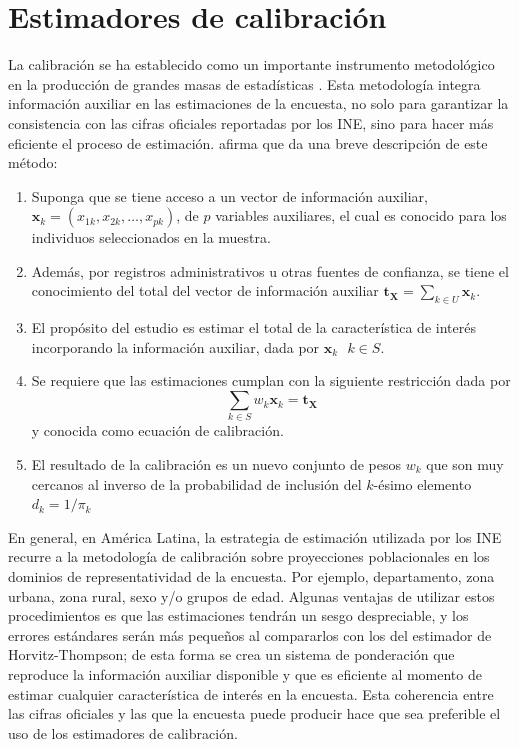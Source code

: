 \documentclass[
  10pt,
  spanish,
]{book}
\providecommand{\tightlist}{%
  \setlength{\itemsep}{0pt}\setlength{\parskip}{0pt}}
\begin{document}
\hypertarget{estimadores-de-calibraciuxf3n}{%
\section{Estimadores de calibración}\label{estimadores-de-calibraciuxf3n}}

La calibración se ha establecido como un importante instrumento metodológico en la producción de grandes masas de estadísticas \citep{Sar08}. Esta metodología integra información auxiliar en las estimaciones de la encuesta, no solo para garantizar la consistencia con las cifras oficiales reportadas por los INE, sino para hacer más eficiente el proceso de estimación. \citet{Gutierrez_2016} afirma que da una breve descripción de este método:

\begin{enumerate}
\def\labelenumi{\arabic{enumi}.}
\tightlist
\item
  Suponga que se tiene acceso a un vector de información auxiliar, \(\mathbf{x}_k=(x_{1k}, x_{2k},\ldots,x_{pk})\), de \(p\) variables auxiliares, el cual es conocido para los individuos seleccionados en la muestra.
\item
  Además, por registros administrativos u otras fuentes de confianza, se tiene el conocimiento del total del vector de información auxiliar \(\mathbf{t_X}=\sum_{k\in U}\mathbf{x}_k\).
\item
  El propósito del estudio es estimar el total de la característica de interés incorporando la información auxiliar, dada por \(\mathbf{x}_k \ \ \ k\in S\).
\item
  Se requiere que las estimaciones cumplan con la siguiente restricción dada por
  \[
    \sum_{k\in S}w_k\mathbf{x}_k = \mathbf{t_X}
  \]
  y conocida como ecuación de calibración.
\item
  El resultado de la calibración es un nuevo conjunto de pesos \(w_k\) que son muy cercanos al inverso de la probabilidad de inclusión del \(k\)-ésimo elemento \(d_k=1/\pi_k\)
\end{enumerate}

En general, en América Latina, la estrategia de estimación utilizada por los INE recurre a la metodología de calibración sobre proyecciones poblacionales en los dominios de representatividad de la encuesta. Por ejemplo, departamento, zona urbana, zona rural, sexo y/o grupos de edad. Algunas ventajas de utilizar estos procedimientos es que las estimaciones tendrán un sesgo despreciable, y los errores estándares serán más pequeños al compararlos con los del estimador de Horvitz-Thompson; de esta forma se crea un sistema de ponderación que reproduce la información auxiliar disponible y que es eficiente al momento de estimar cualquier característica de interés en la encuesta. Esta coherencia entre las cifras oficiales y las que la encuesta puede producir hace que sea preferible el uso de los estimadores de calibración.
\end{document}
